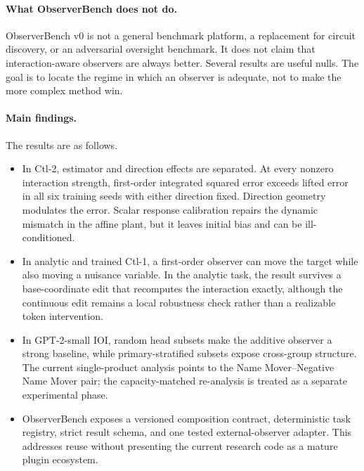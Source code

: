 \paragraph{What ObserverBench does not do.}
ObserverBench v0 is not a general benchmark platform, a replacement for
circuit discovery, or an adversarial oversight benchmark. It does not claim
that interaction-aware observers are always better. Several results are useful
nulls. The goal is to locate the regime in which an observer is adequate, not
to make the more complex method win.

\paragraph{Main findings.}
The results are as follows.

\begin{itemize}
  \item In Ctl-2, estimator and direction effects are separated. At every
  nonzero interaction strength, first-order integrated squared error exceeds
  lifted error in all six training seeds with either direction fixed.
  Direction geometry modulates the error. Scalar response calibration repairs
  the dynamic mismatch in the affine plant, but it leaves initial bias and can
  be ill-conditioned.

  \item In analytic and trained Ctl-1, a first-order observer can move the
  target while also moving a nuisance variable. In the analytic task, the
  result survives a base-coordinate edit that recomputes the interaction
  exactly, although the continuous edit remains a local robustness check rather
  than a realizable token intervention.

  \item In GPT-2-small IOI, random head subsets make the additive observer a
  strong baseline, while primary-stratified subsets expose cross-group
  structure. The current single-product analysis points to the Name
  Mover--Negative Name Mover pair; the capacity-matched re-analysis is treated
  as a separate experimental phase.

  \item ObserverBench exposes a versioned composition contract, deterministic
  task registry, strict result schema, and one tested external-observer adapter.
  This addresses reuse without presenting the current research code as a
  mature plugin ecosystem.
\end{itemize}
